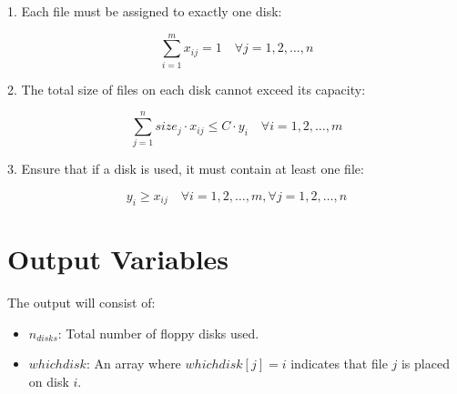 \documentclass{article}
\begin{document}
1. Each file must be assigned to exactly one disk:

\[
\sum_{i=1}^{m} x_{ij} = 1 \quad \forall j = 1, 2, \ldots, n
\]

2. The total size of files on each disk cannot exceed its capacity:

\[
\sum_{j=1}^{n} size_j \cdot x_{ij} \leq C \cdot y_i \quad \forall i = 1, 2, \ldots, m
\]

3. Ensure that if a disk is used, it must contain at least one file:

\[
y_i \geq x_{ij} \quad \forall i = 1, 2, \ldots, m, \forall j = 1, 2, \ldots, n
\]

\section*{Output Variables}

The output will consist of:
\begin{itemize}
    \item $n_{disks}$: Total number of floppy disks used.
    \item $whichdisk$: An array where $whichdisk[j] = i$ indicates that file $j$ is placed on disk $i$.
\end{itemize}
\end{document}
